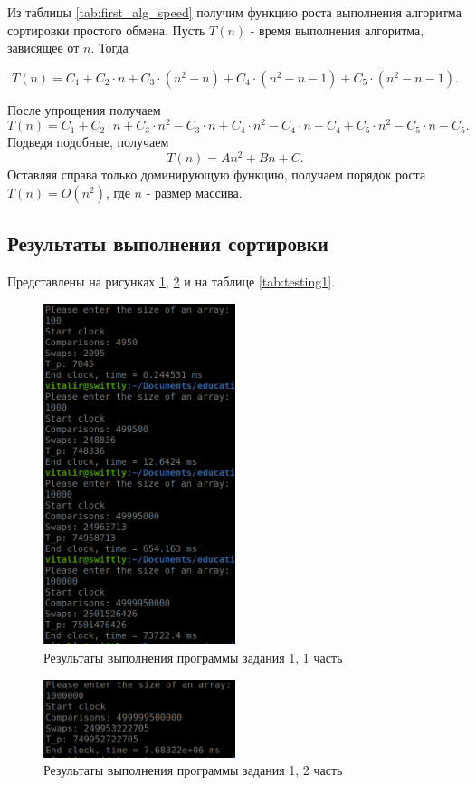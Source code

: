 \documentclass[14pt]{extarticle}
\begin{document}
Из таблицы \ref{tab:first_alg_speed} получим функцию роста выполнения алгоритма
сортировки простого обмена. Пусть $T(n)$ - время выполнения алгоритма, зависящее
от  $n$. Тогда
 
\[
  T(n) = C_1 + C_2\cdot n + C_3\cdot (n^2-n) + C_4\cdot (n^2-n-1)
  + C_5\cdot (n^2-n-1)
.\] 

После упрощения получаем
\[
  T(n) = C_1 + C_2\cdot n + C_3 \cdot n^2 - C_3\cdot n + C_4\cdot n^2
  - C_4\cdot n - C_4 + C_5\cdot n^2 - C_5\cdot n - C_5
.\] 
Подведя подобные, получаем
\[
  T(n) = An^2+Bn+C
.\] 
Оставляя справа только доминирующую функцию, получаем порядок роста
$T(n) = O(n^2)$, где  $n$ - размер массива.
\subsection{Результаты выполнения сортировки}
Представлены на рисунках \ref{fig:alg_speed1}, \ref{fig:alg_speed2}
и на таблице \ref{tab:testing1}.

\begin{figure}[htpb]
  \centering
  \includegraphics[width=0.5\textwidth]{pictures/alg1_speed1.png}
  \caption{Результаты выполнения программы задания 1, 1 часть}
  \label{fig:alg_speed1}
\end{figure}

\begin{figure}[htpb]
  \centering
  \includegraphics[width=0.5\textwidth]{pictures/alg1_speed2.png}
  \caption{Результаты выполнения программы задания 1, 2 часть}
  \label{fig:alg_speed2}
\end{figure}
\end{document}
